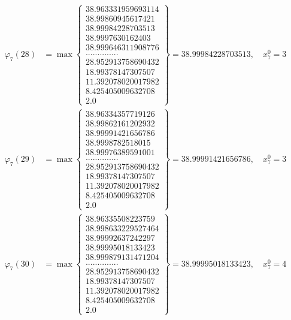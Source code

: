 \documentclass{article}
\begin{document}
\begin{align*}
  
  
  
\varphi_{7}(28) &= \max \left\{ \begin{array}{c}
38.963331959693114 \\
 38.99860945617421 \\
 38.99984228703513 \\
 38.9997630162403 \\
 38.999646311908776 \\
 .............. \\
 28.952913758690432 \\
 18.99378147307507 \\
 11.392078020017982 \\
 8.425405009632708 \\
 2.0
\end{array} \right\} = 38.99984228703513, \quad x_{7}^0 = 3\\
  
  
  
  
\varphi_{7}(29) &= \max \left\{ \begin{array}{c}
38.96334357719126 \\
 38.99862161202932 \\
 38.99991421656786 \\
 38.9998782518015 \\
 38.99976389591001 \\
 .............. \\
 28.952913758690432 \\
 18.99378147307507 \\
 11.392078020017982 \\
 8.425405009632708 \\
 2.0
\end{array} \right\} = 38.99991421656786, \quad x_{7}^0 = 3\\
  
  
  
  
\varphi_{7}(30) &= \max \left\{ \begin{array}{c}
38.96335508223759 \\
 38.998633229527464 \\
 38.99992637242297 \\
 38.99995018133423 \\
 38.999879131471204 \\
 .............. \\
 28.952913758690432 \\
 18.99378147307507 \\
 11.392078020017982 \\
 8.425405009632708 \\
 2.0
\end{array} \right\} = 38.99995018133423, \quad x_{7}^0 = 4\\
  

\end{align*}
\end{document}
